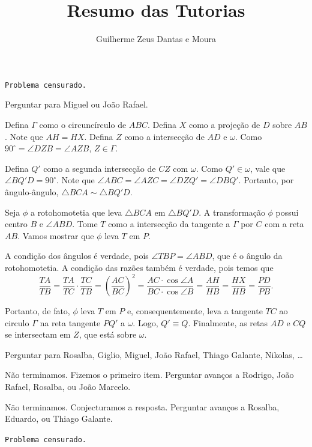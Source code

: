 \documentclass[10pt,a4paper]{article}
\title{Resumo das Tutorias}
\author{Guilherme Zeus Dantas e Moura}
\begin{document}
	
 	\zeustitle

	\begin{prob}
		\texttt{Problema censurado.}
	\end{prob}
	\begin{sk}
		Perguntar para Miguel ou João Rafael.
	\end{sk}
	\begin{sol}
		Defina $\Gamma$ como o circuncírculo de $ABC$.
		Defina $X$ como a projeção de $D$ sobre $AB$. Note que $AH = HX$.
		Defina $Z$ como a intersecção de $AD$ e $\omega$. Como $90^\circ = \angle DZB = \angle AZB$,  $Z \in \Gamma$.

		Defina $Q'$ como a segunda intersecção de $CZ$ com $\omega$. Como $Q' \in \omega$, vale que $\angle BQ'D = 90^\circ$. Note que $\angle ABC = \angle AZC = \angle DZQ' = \angle DBQ'$. Portanto, por ângulo-ângulo, $\triangle BCA \sim \triangle BQ'D$.

		Seja $\phi$ a rotohomotetia que leva $\triangle BCA$ em $\triangle BQ'D$. A transformação $\phi$ possui centro $B$ e $\angle ABD$. 
		Tome $T$ como a intersecção da tangente a $\Gamma$ por $C$ com a reta $AB$. Vamos mostrar que $\phi$ leva $T$ em $P$.

		A condição dos ângulos é verdade, pois $\angle TBP = \angle ABD$, que é o ângulo da rotohomotetia.
		A condição das razões também é verdade, pois temos que  \[
			\frac{TA}{TB} = \frac{TA}{TC}\cdot\frac{TC}{TB} = \left(\frac{AC}{BC}\right)^2 = \frac{AC\cdot\cos\angle A}{BC\cdot\cos\angle B} = \frac{AH}{HB} = \frac{HX}{HB} = \frac{PD}{PB}.
		\]

		Portanto, de fato, $\phi$ leva $T$ em $P$ e, consequentemente, leva a tangente $TC$ ao circulo $\Gamma$ na reta tangente $PQ'$ a $\omega$. Logo, $Q' \equiv Q$.  
		Finalmente, as retas $AD$ e $CQ$ se intersectam em $Z$, que está sobre $\omega$.
	\end{sol}
	\begin{sk}
		Perguntar para Rosalba, Giglio, Miguel, João Rafael, Thiago Galante, Nikolas, \dots
	\end{sk}
	\begin{sk}
		Não terminamos. Fizemos o primeiro item. Perguntar avanços a Rodrigo, João Rafael, Rosalba, ou João Marcelo.
	\end{sk}
	\begin{sk}
		Não terminamos. Conjecturamos a resposta. Perguntar avanços a Rosalba, Eduardo, ou Thiago Galante.
	\end{sk}
	\begin{prob}
		\texttt{Problema censurado.}
	\end{prob}
\end{document}
